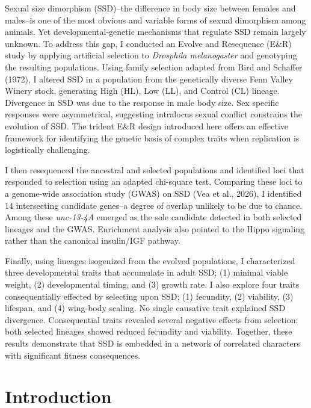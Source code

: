 \documentclass[12pt,reqno,oneside]{report}
\begin{document}
Sexual size dimorphism (SSD)--the difference in body size between females and males--is one of the most obvious and variable forms of sexual dimorphism among animals. Yet developmental-genetic mechanisms that regulate SSD remain largely unknown. To address this gap, I conducted an Evolve and Resequence (E\&R) study by applying artificial selection to \textit{Drosphila melanogaster} and genotyping the resulting populations. Using family selection adapted from Bird and Schaffer (1972), I altered SSD in a population from the genetically diverse Fenn Valley Winery stock, generating High (HL), Low (LL), and Control (CL) lineage. Divergence in SSD was due to the response in male body size. Sex specific responses were asymmetrical, suggesting intralocus sexual conflict constrains the evolution of SSD. The trident E\&R design introduced here offers an effective framework for identifying the genetic basis of complex traits when replication is logistically challenging.

I then resequenced the ancestral and selected populations and identified loci that responded to selection using an adapted chi-square test. Comparing these loci to a genome-wide association study (GWAS) on SSD (Vea et al., 2026), I identified 14 intersecting candidate genes--a degree of overlap unlikely to be due to chance. Among these \textit{unc-13-4A} emerged as the sole candidate detected in both selected lineages and the GWAS. Enrichment analysis also pointed to the Hippo signaling rather than the canonical insulin/IGF pathway.

Finally, using lineages isogenized from the evolved populations, I characterized three developmental traits that accumulate in adult SSD; (1) minimal viable weight, (2) developmental timing, and (3) growth rate. I also explore four traits consequentially effected by selecting upon SSD; (1) fecundity, (2) viability, (3) lifespan, and (4) wing-body scaling. No single causative trait explained SSD divergence. Consequential traits revealed several negative effects from selection: both selected lineages showed reduced fecundity and viability. Together, these results demonstrate that SSD is embedded in a network of correlated characters with significant fitness consequences.

\newpage
{}
\setcounter{page}{1}
\pagestyle{fancy}

\mainmatter

\chapter{Introduction}
\end{document}
